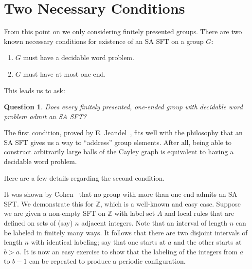 \documentclass[12pt,reqno]{amsart}
\theoremstyle{plain}
\theoremstyle{definition}
\numberwithin{subcase}{case}
\theoremstyle{plain}
\newtheorem{que}[thm]{Question}
\theoremstyle{definition}
\begin{document}
\section{Two Necessary Conditions}
\label{section:TwoNecessaryConditions}

From this point on we only considering finitely presented groups.
There are two known necessary conditions for existence of an SA SFT on a group \(G\):

	\begin{enumerate}
	\item \(G\) must have a decidable word problem.
	\item \(G\) must have at most one end.
	\end{enumerate}
	
This leads us to ask:

\begin{que}
Does every finitely presented, one-ended group with decidable word problem admit an SA SFT?
\end{que}


The first condition, proved by E. Jeandel~\cite{jeandel}, fits well with the philosophy that an SA SFT gives us a way to ``address'' group elements. After all, being able to construct arbitrarily large balls of the Cayley graph is equivalent to having a decidable word problem. 

Here are a few details regarding the second condition.

It was shown by Cohen~\cite{DBCohen} that no group with more than one end admits an SA SFT. We demonstrate this for \(\mathbb{Z}\), which is a well-known and easy case.  Suppose we are given a non-empty SFT on \(\mathbb{Z}\) with label set \(A\) and local rules that are defined on sets of (say) \(n\) adjacent integers. Note that an interval of length \(n\) can be labeled in finitely many ways. It follows that there are two disjoint intervals of length \(n\) with identical labeling; say that one starts at \(a\) and the other starts at \(b > a\). It is now an easy exercise to show that the labeling of the integers from \(a\) to \(b-1\) can be repeated to produce a periodic configuration.
\end{document}
